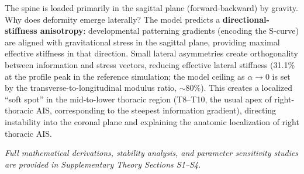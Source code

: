 The spine is loaded primarily in the sagittal plane (forward-backward) by gravity. Why does deformity emerge laterally? The model predicts a \textbf{directional-stiffness anisotropy}: developmental patterning gradients (encoding the S-curve) are aligned with gravitational stress in the sagittal plane, providing maximal effective stiffness in that direction. Small lateral asymmetries create orthogonality between information and stress vectors, reducing effective lateral stiffness (31.1\% at the profile peak in the reference simulation; the model ceiling as $\alpha \to 0$ is set by the transverse-to-longitudinal modulus ratio, ${\sim}80\%$). This creates a localized ``soft spot'' in the mid-to-lower thoracic region (T8--T10, the usual apex of right-thoracic AIS, corresponding to the steepest information gradient), directing instability into the coronal plane and explaining the anatomic localization of right thoracic AIS.

\textit{Full mathematical derivations, stability analysis, and parameter sensitivity studies are provided in Supplementary Theory Sections S1--S4.}

